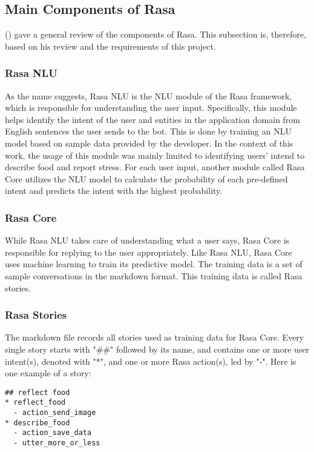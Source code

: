 \subsection{Main Components of Rasa}
\citeauthor{16_martin} (\citeyear{17_ludwig}) gave a general review of the components of Rasa. This subsection is, therefore, based on his review and the requirements of this project.

\subsubsection{Rasa NLU}
As the name suggests, Rasa NLU is the NLU module of the Rasa framework, which is responsible for understanding the user input. Specifically, this module helps identify the intent of the user and entities in the application domain from English sentences the user sends to the bot. This is done by training an NLU model based on sample data provided by the developer. In the context of this work, the usage of this module was mainly limited to identifying users' intend to describe food and report stress. For each user input, another module called Rasa Core utilizes the NLU model to calculate the probability of each pre-defined intent and predicts the intent with the highest probability.

\subsubsection{Rasa Core}
While Rasa NLU takes care of understanding what a user says, Rasa Core is responsible for replying to the user appropriately. Like Rasa NLU, Rasa Core uses machine learning to train its predictive model. The training data is a set of sample conversations in the markdown format. This training data is called Rasa stories.

\subsubsection{Rasa Stories}
The markdown file records all stories used as training data for Rasa Core. Every single story starts with "\#\#" followed by its name, and contains one or more user intent(s), denoted with "*", and one or more Rasa action(s), led by "-". Here is one example of a story:\bigskip

\begin{lstlisting}
## reflect food
* reflect_food
  - action_send_image
* describe_food
  - action_save_data
  - utter_more_or_less
\end{lstlisting}

